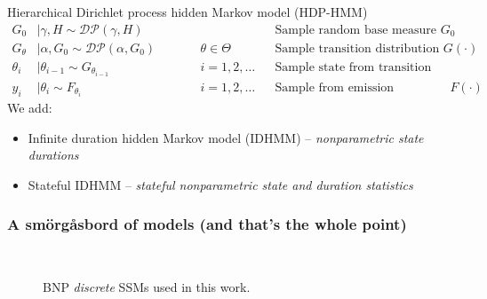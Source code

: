 \documentclass[aspectratio=169]{beamer}
\begin{document}
\begin{frame}
    Hierarchical Dirichlet process hidden Markov model (HDP-HMM) 
    \begin{align*}
        G_0&\mid \gamma, H \sim \mathcal{DP}(\gamma,H)&&  && \textrm{Sample random base measure }G_0\\
        G_\theta&\mid \alpha,G_0 \sim \mathcal{DP}(\alpha,G_0) &&\qquad \theta\in\Theta && \textrm{Sample transition distribution } G(\cdot)\\
        \theta_{i}&\mid \theta_{i-1}  \sim G_{\theta_{i-1}} &&\qquad i=1,2,\ldots && \textrm{Sample state from transition distribution}\\
        y_i&\mid \theta_i \sim F_{\theta_i} &&\qquad i=1,2,\ldots && \textrm{Sample from emission distribution }F(\cdot)
    \end{align*}
    We add:
    \begin{itemize}
        \item Infinite duration hidden Markov model (IDHMM) -- \emph{nonparametric state durations}
        \item Stateful IDHMM -- \emph{stateful nonparametric state and duration statistics} 
    \end{itemize}
\end{frame}





\begin{frame}
    \frametitle{A sm\"{o}rg\aa sbord of models (and that's the whole point)}

    \vspace{-1em}
    \begin{figure}[ht!]
        \hfill
        \hfill
        \\
        \hspace{2em}
        \caption{BNP \emph{discrete} SSMs used in this work.}
    \end{figure}
\end{frame}
\end{document}
